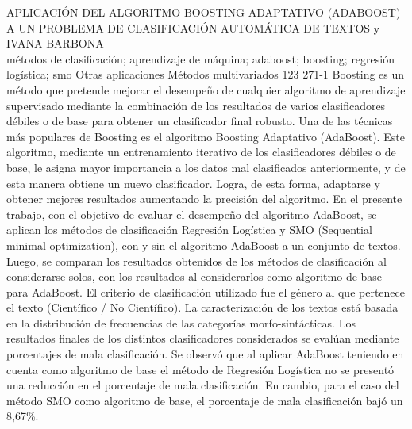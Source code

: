 \A
{APLICACIÓN DEL ALGORITMO BOOSTING ADAPTATIVO (ADABOOST) A UN PROBLEMA DE CLASIFICACIÓN AUTOMÁTICA DE TEXTOS}
{ y IVANA BARBONA}
{
\\}
{métodos de clasificación; aprendizaje de máquina; adaboost; boosting; regresión logística; smo} 
 {Otras aplicaciones} 
 {Métodos multivariados} 
 {123} 
 {271-1}
{Boosting es un método que pretende mejorar el desempeño de cualquier algoritmo de aprendizaje supervisado mediante la combinación de los resultados de varios clasificadores débiles o de base para obtener un clasificador final robusto. Una de las técnicas más populares de Boosting es el algoritmo Boosting Adaptativo (AdaBoost). Este algoritmo, mediante un entrenamiento iterativo de los clasificadores débiles o de base, le asigna mayor importancia a los datos mal clasificados anteriormente, y de esta manera obtiene un nuevo clasificador. Logra, de esta forma, adaptarse y obtener mejores resultados aumentando la precisión del algoritmo. En el presente trabajo, con el objetivo de evaluar el desempeño del algoritmo AdaBoost, se aplican los métodos de clasificación Regresión Logística y SMO (Sequential minimal optimization), con y sin el algoritmo AdaBoost a un conjunto de textos. Luego, se comparan los resultados obtenidos de los métodos de clasificación al considerarse solos, con los resultados al considerarlos como algoritmo de base para AdaBoost. El criterio de clasificación utilizado fue el género al que pertenece el texto (Científico / No Científico). La caracterización de los textos está basada en la distribución de frecuencias de las categorías morfo-sintácticas. Los resultados finales de los distintos clasificadores considerados se evalúan mediante porcentajes de mala clasificación. Se observó que al aplicar AdaBoost teniendo en cuenta como algoritmo de base el método de Regresión Logística no se presentó una reducción en el porcentaje de mala clasificación. En cambio, para el caso del método SMO como algoritmo de base, el porcentaje de mala clasificación bajó un 8,67\%. }
